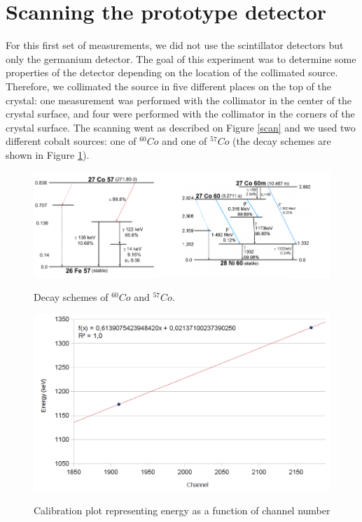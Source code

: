 \documentclass[11pt,a4paper]{article}
\begin{document}
\section{Scanning the prototype detector}

For this first set of measurements, we did not use the scintillator detectors but only the germanium detector. The goal of this experiment was to determine some properties of the detector depending on the location of the collimated source. Therefore, we collimated the source in five different places on the top of the crystal: one measurement was performed with the collimator in the center of the crystal surface, and four were performed with the collimator in the corners of the crystal surface. The scanning went as described on Figure \ref{scan} and we used two different cobalt sources: one of $^{60}Co$ and one of $^{57}Co$ (the decay schemes are shown in Figure \ref{decayCos}).

\begin{figure}[!h]
\centering
\includegraphics[scale=0.9]{Cos_decays.png}
\label{decayCos}
\caption{Decay schemes of $^{60}Co$ and $^{57}Co$.}
\end{figure}

\begin{figure}[!h]
\centering
\includegraphics[scale=0.6]{calibration.png}
\label{calibration}
\caption{Calibration plot representing energy as a function of channel number}
\end{figure}
\end{document}
